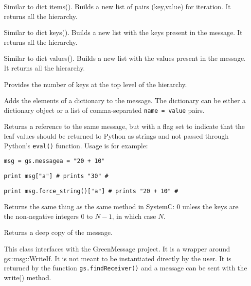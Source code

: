 \documentclass[12pt,oneside]{gsbook}
\begin{document}
\begin{methods}

 {Similar to dict items(). Builds a new list of pairs
  (key,value) for iteration. It returns all the hierarchy.}

 {Similar to dict keys(). Builds a new list with the
  keys present in the message. It returns all the hierarchy.}

 {Similar to dict values(). Builds a new list with the
  values present in the message. It returns all the hierarchy.}

 {Provides the number of keys at the top level
of the hierarchy.}

 {Adds the elements of a dictionary to
the message.  The dictionary can be either a dictionary object or
a list of comma-separated \texttt{name = value} pairs.}

 {Returns a reference to the same message, but
with a flag set to indicate that the leaf values should be returned to
Python as strings and not passed through Python's \texttt{eval()}
function.  Usage is for example:

\texttt{msg = gs.message{a = "20 + 10"}}

\texttt{print msg["a"]  \# prints "30" \#}

\texttt{print msg.force\_string()["a"]  \# prints "20 + 10" \#}
}

 {Returns the same thing as the same
method in SystemC:  0 unless the keys are the non-negative integers
$0$ to $N-1$, in which case $N$.}

 {Returns a deep copy of the message.}

\end{methods}



 { This class interfaces with the GreenMessage
  project. It is a wrapper around gs::msg::WriteIf. It is not meant to
  be instantiated directly by the user. It is returned by the function
  \texttt{gs.findReceiver()} and a message can be sent with the
  write() method. }
\end{document}
